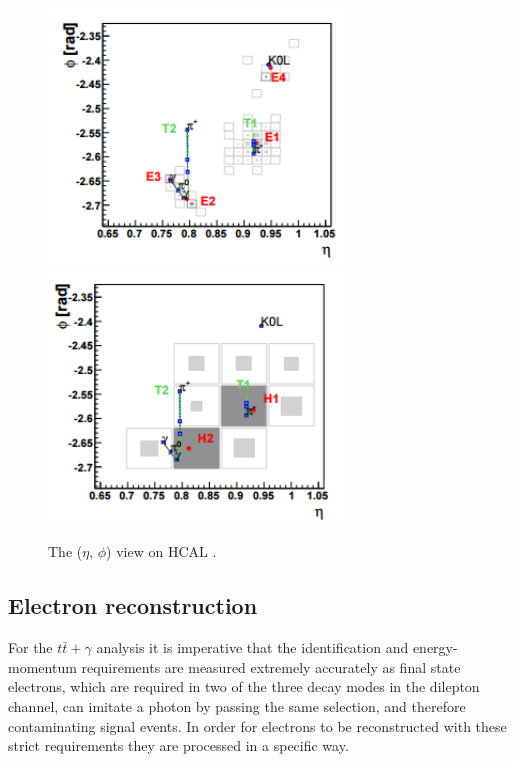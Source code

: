 \begin{figure}
\begin{center}
\includegraphics[width=0.7\textwidth]{Figures/PFECAL.png} \\
\includegraphics[width=0.7\textwidth]{Figures/PFHCAL.png} \\
\end{center}
\caption{The ($\eta$, $\phi$) view on HCAL \cite{CMS-PAS-PFT-09-001}.}
\end{figure}
   

\subsection{Electron reconstruction} \label{subsec-ElectronReconstruction}

For the $t\bar{t}+\gamma$ analysis it is imperative that the identification and energy-momentum requirements are measured extremely accurately as final state electrons, which are required in two of the three decay modes in the dilepton channel, can imitate a photon by passing the same selection, and therefore contaminating signal events. In order for electrons to be reconstructed with these strict requirements they are processed in a specific way.

